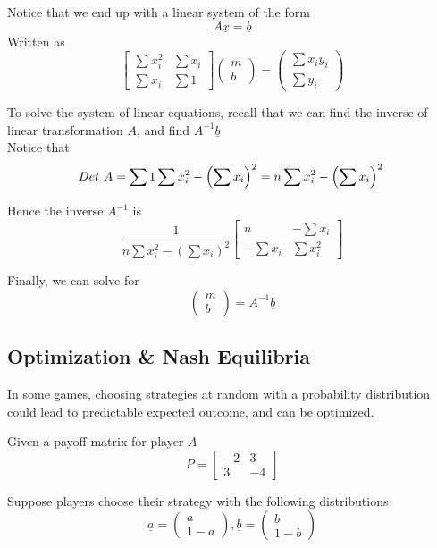Notice that we end up with a linear system of the form
\[
  A \underline{x} = \underline{b}
\] 
Written as
\[
  \begin{bmatrix} 
     \sum x_i^2 & \sum x_i \\ \sum x_i & \sum 1  
  \end{bmatrix} \begin{pmatrix} m \\ b \end{pmatrix} = 
  \begin{pmatrix} \sum x_i y_i \\ \sum y_i \end{pmatrix} 
\] 

To solve the system of linear equations, recall that we can find the inverse of linear transformation $A$, and find $A^{-1} \underline{b}$ \\

Notice that \[
  Det\ A = \sum 1 \sum x_i^2 - \left( \sum x_i \right)^2 = n \sum x_i^2 - \left( \sum x_i \right)^2 \\
\] 

Hence the inverse $A^{-1}$ is
 \[
  \frac{1}{n  \sum x_i^2 - \left( \sum x_i \right)^2} \begin{bmatrix} 
     n & - \sum x_i \\ - \sum x_i & \sum x_i^2
  \end{bmatrix}
\] 

Finally, we can solve for \[
   \begin{pmatrix} m \\ b \end{pmatrix}  = A^{-1} \underline{b}
\] 


\subsection{Optimization \& Nash Equilibria}

In some games, choosing strategies at random with a probability distribution could lead to predictable expected outcome, and can be optimized.

Given a payoff matrix for player $A$ \[
  P = \begin{bmatrix} 
     -2 & 3 \\ 3 & -4  
  \end{bmatrix}
\] 

Suppose players choose their strategy with the following distributions
\[
  \underline{a} = \begin{pmatrix} a \\ 1-a \end{pmatrix}, \underline{b} = \begin{pmatrix}  b \\ 1 -b \end{pmatrix} 
\] 

